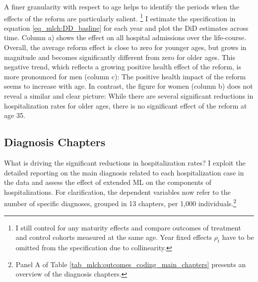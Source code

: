 A finer granularity with respect to age helps to identify the periods when the effects of the reform are particularly salient. \footnote{I still control for any maturity effects and compare outcomes of treatment and control cohorts measured at the same age. Year fixed effects $\rho_t$ have to be omitted from the specification due to collinearity.} \label{rev_mlch: editor_parallel_trends_text}I estimate the specification in equation \ref{eq_mlch:DD_basline} for each year and plot the DiD estimates across time. Column a) shows the effect on all hospital admissions over the life-course. Overall, the average reform effect is close to zero for younger ages, but grows in magnitude and becomes significantly different from zero for older ages. This negative trend, which reflects a growing positive health effect of the reform, is more pronounced for men (column c): The positive health impact of the reform seems to increase with age. In contrast, the figure for women (column b) does not reveal a similar and clear picture: While there are several significant reductions in hospitalization rates for older ages, there is no significant effect of the reform at age 35.



\bigskip
\subsection{Diagnosis Chapters}

What is driving the significant reductions in hospitalization rates? I exploit the detailed reporting on the main diagnosis related to each hospitalization case in the data and assess the effect of extended ML on the components of hospitalizations. For clarification, the dependent variables now refer to the number of specific diagnoses, grouped in 13 chapters, per 1,000 individuals.\footnote{Panel A of Table \ref{tab_mlch:outcomes_coding_main_chapters} presents an overview of the diagnosis chapters.} 


